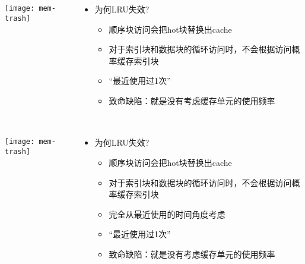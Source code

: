 \begin{frame}[plain]
	\frametitle{ }
	\begin{columns}
		\begin{column}{.5\textwidth}
			\centering
			\texttt{[image: mem-trash]}
		\end{column}
		
		\begin{column}{.5\textwidth}
			
			\begin{itemize}
				\item 为何LRU失效?
				\begin{itemize}
					
					\item 顺序块访问会把hot块替换出cache
					\item 对于索引块和数据块的循环访问时，不会根据访问概率缓存索引块
					
					\item “最近使用过1次”
					\item 致命缺陷：就是没有考虑缓存单元的使用频率
				\end{itemize}
			\end{itemize}
			
			
		\end{column}
		
		
	\end{columns}
\end{frame}



\begin{frame}[plain]
	\frametitle{ }
	\begin{columns}
		\begin{column}{.5\textwidth}
			\centering
			\texttt{[image: mem-trash]}
		\end{column}
		
		\begin{column}{.5\textwidth}
			
			\begin{itemize}
				\item 为何LRU失效?
				\begin{itemize}
					
					\item 顺序块访问会把hot块替换出cache
					\item 对于索引块和数据块的循环访问时，不会根据访问概率缓存索引块
					
					\item 完全从最近使用的时间角度考虑
					\item “最近使用过1次”
					\item 致命缺陷：就是没有考虑缓存单元的使用频率
				\end{itemize}
			\end{itemize}
			
			
		\end{column}
		
		
	\end{columns}
\end{frame}


